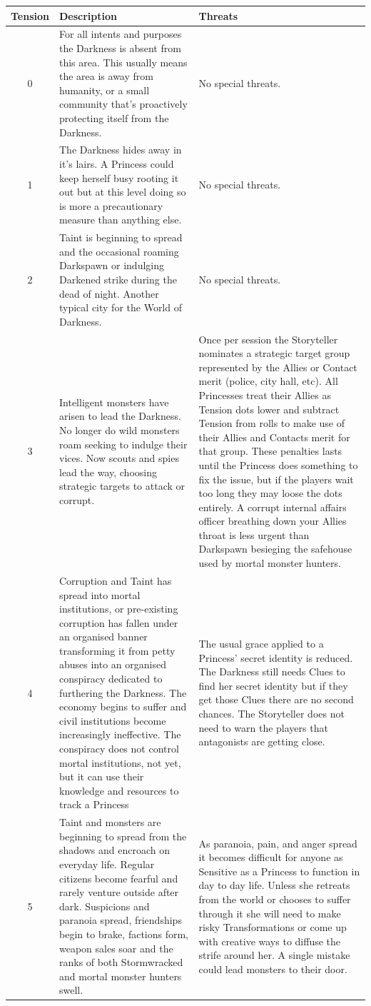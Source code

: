 \begin{tabularx}{\linewidth}{|c|X|X|}
        \hline
        Tension & Description & Threats\\ \hline
		0 & For all intents and purposes the Darkness is absent from this area. This usually means the area is away from humanity, or a small community that's proactively protecting itself from the Darkness. & No special threats.\\ \hline
		1 & The Darkness hides away in it's lairs. A Princess could keep herself busy rooting it out but at this level doing so is more a precautionary measure than anything else. & No special threats.\\ \hline
        2 & Taint is beginning to spread and the occasional roaming Darkspawn or indulging Darkened strike during the dead of night. Another typical city for the World of Darkness. & No special threats. \\ \hline
		3 & Intelligent monsters have arisen to lead the Darkness. No longer do wild monsters roam seeking to indulge their vices. Now scouts and spies lead the way, choosing strategic targets to attack or corrupt. & Once per session the Storyteller nominates a strategic target group represented by the Allies or Contact merit (police, city hall, etc). All Princesses treat their Allies as Tension dots lower and subtract Tension from rolls to make use of their Allies and Contacts merit for that group. These penalties lasts until the Princess does something to fix the issue, but if the players wait too long they may loose the dots entirely. A corrupt internal affairs officer breathing down your Allies throat is less urgent than Darkspawn besieging the safehouse used by mortal monster hunters.\\ \hline
		4 & Corruption and Taint has spread into mortal institutions, or pre-existing corruption has fallen under an organised banner transforming it from petty abuses into an organised conspiracy dedicated to furthering the Darkness. The economy begins to suffer and civil institutions become increasingly ineffective. The conspiracy does not control mortal institutions, not yet, but it can use their knowledge and resources to track a Princess & The usual grace applied to a Princess' secret identity is reduced. The Darkness still needs Clues to find her secret identity but if they get those Clues there are no second chances. The Storyteller does not need to warn the players that antagonists are getting close. \\ \hline
		5 & Taint and monsters are beginning to spread from the shadows and encroach on everyday life. Regular citizens become fearful and rarely venture outside after dark. Suspicions and paranoia spread, friendships begin to brake, factions form, weapon sales soar and the ranks of both Stormwracked and mortal monster hunters swell. & As paranoia, pain, and anger spread it becomes difficult for anyone as Sensitive as a Princess to function in day to day life. Unless she retreats from the world or chooses to suffer through it she will need to make risky Transformations or come up with creative ways to diffuse the strife around her. A single mistake could lead monsters to their door. \\ \hline

\end{tabularx}
